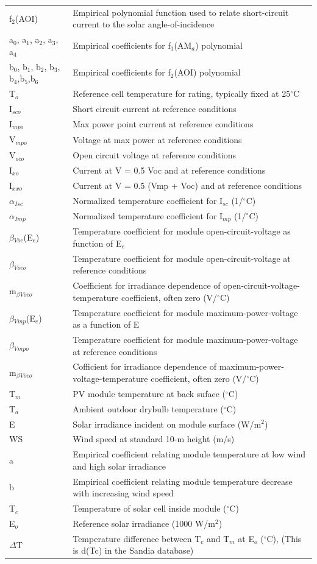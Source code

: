 \begin{longtable}[c]{p{1.2in}p{4.8in}}
f\(_{2}\)(AOI) & Empirical polynomial function used to relate short-circuit current to the solar angle-of-incidence \tabularnewline
a\(_{0}\), a\(_{1}\), a\(_{2}\), a\(_{3}\), a\(_{4}\) & Empirical coefficients for f\(_{1}\)(AM\(_{a}\)) polynomial \tabularnewline
b\(_{0}\), b\(_{1}\), b\(_{2}\), b\(_{3}\), b\(_{4}\),b\(_{5}\),b\(_{6}\) & Empirical coefficients for f\(_{2}\)(AOI) polynomial \tabularnewline
T\(_{o}\) & Reference cell temperature for rating, typically fixed at 25\(^{\circ}\)C \tabularnewline
I\(_{sco}\) & Short circuit current at reference conditions \tabularnewline
I\(_{mpo}\) & Max power point current at reference conditions \tabularnewline
V\(_{mpo}\) & Voltage at max power at reference conditions \tabularnewline
V\(_{oco}\) & Open circuit voltage at reference conditions \tabularnewline
I\(_{xo}\) & Current at V = 0.5 Voc and at reference conditions \tabularnewline
I\(_{xxo}\) & Current at V = 0.5 (Vmp + Voc) and at reference conditions \tabularnewline
$\alpha$\(_{Isc}\) & Normalized temperature coefficient for I\(_{sc}\) (1/\(^{\circ}\)C) \tabularnewline
$\alpha$\(_{Imp}\) & Normalized temperature coefficient for I\(_{mp}\) (1/\(^{\circ}\)C) \tabularnewline
$\beta$\(_{Voc}\)(E\(_{e}\)) & Temperature coefficient for module open-circuit-voltage as function of E\(_{e}\) \tabularnewline
$\beta$\(_{Voco}\) & Temperature coefficient for module open-circuit-voltage at reference conditions \tabularnewline
m\(_{\beta}\)\(_{Voco}\) & Coefficient for irradiance dependence of open-circuit-voltage-temperature coefficient, often zero (V/\(^{\circ}\)C) \tabularnewline
$\beta$\(_{Vmp}\)(E\(_{e}\)) & Temperature coefficient for module maximum-power-voltage as a function of E \tabularnewline
$\beta$\(_{Vmpo}\) & Temperature coefficient for module maximum-power-voltage at reference conditions \tabularnewline
m\(_{\beta}\)\(_{Voco}\) & Cofficient for irradiance dependence of maximum-power-voltage-temperature coefficient, often zero (V/\(^{\circ}\)C) \tabularnewline
T\(_{m}\) & PV module temperature at back suface (\(^{\circ}\)C) \tabularnewline
T\(_{a}\) & Ambient outdoor drybulb temperature (\(^{\circ}\)C) \tabularnewline
E & Solar irradiance incident on module surface (W/m\(^{2}\)) \tabularnewline
WS & Wind speed at standard 10-m height (m/s) \tabularnewline
a & Empirical coefficient relating module temperature at low wind and high solar irradiance \tabularnewline
b & Empirical coefficient relating module temperature decrease with increasing wind speed \tabularnewline
T\(_{c}\) & Temperature of solar cell inside module (\(^{\circ}\)C) \tabularnewline
E\(_{o}\) & Reference solar irradiance (1000 W/m\(^{2}\)) \tabularnewline
$\Delta$T & Temperature difference between T\(_{c}\) and T\(_{m}\) at E\(_{o}\) (\(^{\circ}\)C), (This is d(Tc) in the Sandia database) \tabularnewline
\bottomrule
\end{longtable}

